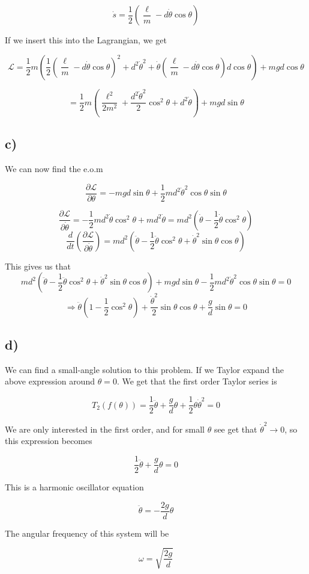 \documentclass[a4paper,norsk, 10pt]{article}
\begin{document}
$$
\dot{s} =\frac{1}{2}(\frac{\ell}{m} -d\dot{\theta}\cos\theta)
$$

If we insert this into the Lagrangian, we get

$$
\mathcal{L} = \frac{1}{2}m(\frac{1}{2}(\frac{\ell}{m} -d\dot{\theta}\cos\theta)^2 +d^2\dot{\theta}^2 + \dot{\theta}(\frac{\ell}{m} -d\dot{\theta}\cos\theta)d\cos\theta) +mgd\cos\theta
$$

$$
= \frac{1}{2}m(\frac{\ell^2}{2m^2} + \frac{d^2\dot{\theta}^2}{2}\cos^2\theta + d^2\dot{\theta}) + mgd\sin\theta
$$

\subsection*{c)}
We can now find the e.o.m

$$
\frac{\partial \mathcal{L}}{\partial \theta} = -mgd\sin\theta + \frac{1}{2}md^2\dot{\theta}^2\cos\theta\sin\theta
$$

$$
\frac{\partial \mathcal{L}}{\partial \dot{\theta}} = -\frac{1}{2}md^2\dot{\theta}\cos^2\theta +md^2\dot{\theta} = md^2(\dot{\theta} - \frac{1}{2}\dot{\theta}\cos^2\theta)
$$
$$
\frac{d}{dt}\left(\frac{\partial \mathcal{L}}{\partial \dot{\theta}}\right) = md^2(\ddot{\theta} - \frac{1}{2}\ddot{\theta}\cos^2\theta + \dot{\theta}^2\sin\theta\cos\theta)
$$

This gives us that
$$
md^2(\ddot{\theta} - \frac{1}{2}\ddot{\theta}\cos^2\theta + \dot{\theta}^2\sin\theta\cos\theta) +mgd\sin\theta - \frac{1}{2}md^2\dot{\theta}^2\cos\theta\sin\theta = 0
$$
$$
\Rightarrow \ddot{\theta}(1-\frac{1}{2}\cos^2\theta) + \frac{\dot{\theta}^2}{2}\sin\theta\cos\theta + \frac{g}{d}\sin\theta = 0
$$

\subsection*{d)}
We can find a small-angle solution to this problem. If we Taylor expand the above expression around $\theta = 0$. We get that the first order Taylor series is

$$
T_2(f(\theta)) = \frac{1}{2}\ddot{\theta}+\frac{g}{d}\theta + \frac{1}{2}\theta\dot{\theta}^2 = 0
$$

We are only interested in the first order, and for small $\theta$ see get that $\dot{\theta}^2 \rightarrow 0$, so this expression becomes

$$
\frac{1}{2}\ddot{\theta}+\frac{g}{d}\theta= 0
$$

This is a harmonic oscillator equation

$$
\ddot{\theta} = - \frac{2g}{d}\theta
$$

The angular frequency of this system will be

$$
\omega = \sqrt{\frac{2g}{d}}
$$
\end{document}
